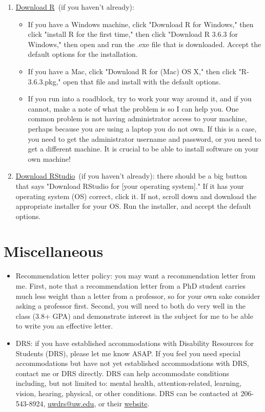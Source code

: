 \documentclass[12pt]{article}
\begin{document}
\begin{enumerate}
	\item \href{https://cran.rstudio.com/}{Download R} (if you haven't already):
	\begin{itemize}
		\item If you have a Windows machine, click "Download R for Windows," then click "install R for the first time," then click "Download R 3.6.3 for Windows," then open and run the .exe file that is downloaded. Accept the default options for the installation.
		\item If you have a Mac, click "Download R for (Mac) OS X," then click "R-3.6.3.pkg," open that file and install with the default options.
		\item If you run into a roadblock, try to work your way around it, and if you cannot, make a note of what the problem is so I can help you. One common problem is not having administrator access to your machine, perhaps because you are using a laptop you do not own. If this is a case, you need to get the administrator username and password, or you need to get a different machine. It is crucial to be able to install software on your own machine!
	\end{itemize}
	\item \href{https://rstudio.com/products/rstudio/download/#download}{Download RStudio} (if you haven't already): there should be a big button that says "Download RStudio for [your operating system]." If it has your operating system (OS) correct, click it. If not, scroll down and download the appropriate installer for your OS. Run the installer, and accept the default options.
\end{enumerate}

\section*{Miscellaneous}

\begin{itemize}
	\item Recommendation letter policy: you may want a recommendation letter from me. First, note that a recommendation letter from a PhD student carries much less weight than a letter from a professor, so for your own sake consider asking a professor first. Second, you will need to both do very well in the class (3.8+ GPA) and demonstrate interest in the subject for me to be able to write you an effective letter.
	\item DRS: if you have established accommodations with Disability Resources for Students (DRS), please let me know ASAP. If you feel you need special accommodations but have not yet established accommodations with DRS, contact me or DRS directly. DRS can help accommodate conditions including, but not limited to: mental health, attention-related, learning, vision, hearing, physical, or other conditions. DRS can be contacted at 206-543-8924, \href{mailto:uwdrs@uw.edu}{uwdrs@uw.edu}, or their \href{http://depts.washington.edu/uwdrs/}{website}.
\end{itemize}
\end{document}
